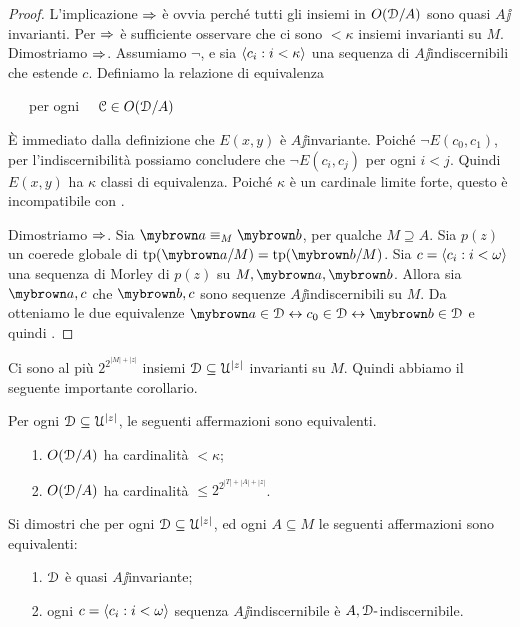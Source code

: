 \begin{proof}
L'implicazione $\Rightarrow$ \`e ovvia perch\'e tutti gli insiemi in $O(\EuScript D/A)$ sono quasi $A\jj$invarianti. Per $\Rightarrow$ \`e sufficiente osservare che ci sono $<\kappa$ insiemi invarianti su $M$. Dimostriamo $\Rightarrow$. Assumiamo $\neg$, e sia $\langle c_i:i<\kappa\rangle$ una sequenza di $A\jj$indiscernibili che estende $c$.  Definiamo la relazione di equivalenza 

\ \ \ per ogni \ \ $\EuScript C\in O(\EuScript D/A)$

\`E immediato dalla definizione che $E(x,y)$ \`e $A\jj$invariante. Poich\'e $\neg E(c_0,c_1)$, per l'indiscernibilit\`a possiamo concludere che  $\neg   E(c_i,c_j)$ per ogni $i<j$. Quindi $E(x,y)$ ha $\kappa$ classi di equivalenza. Poich\'e $\kappa$ \`e un cardinale limite forte, questo \`e incompatibile con .

Dimostriamo $\Rightarrow$. Sia ${\mr a}\equiv_M{\mr b}$, per qualche $M\supseteq A$. Sia $p(z)$ un coerede globale di $\tp({\mr a
}/M)=\tp({\mr b}/M)$. Sia $c=\langle c_i:i<\omega\rangle$ una sequenza di Morley di $p(z)$ su $M,{\mr a},{\mr b}$. Allora sia ${\mr a},c$ che ${\mr b},c$ sono sequenze $A\jj$indiscernibili su $M$. Da  otteniamo le due equivalenze ${\mr a}\in\D\iff c_0\in\D\iff {\mr b}\in\D$ e quindi . 
\end{proof}

Ci sono al pi\`u $2^{2^{|M|+|z|}}$ insiemi $\EuScript D\subseteq\EuScript U^{|z|}$ invarianti su $M$. Quindi abbiamo il seguente importante corollario.  

\begin{corollary}Per ogni $\EuScript D\subseteq\EuScript U^{|z|}$, le seguenti affermazioni sono equivalenti.
\begin{itemize}
\item[1.] $O(\EuScript D/A)$ ha cardinalit\`a $<\kappa$;
\item[2.] $O(\EuScript D/A)$ ha cardinalit\`a $\le 2^{2^{|T|+|A|+|z|}}$.\QED
\end{itemize} 
\end{corollary}


\begin{exercise}
Si dimostri che per ogni $\EuScript D\subseteq\EuScript U^{|z|}$, ed ogni $A\subseteq M$ le seguenti affermazioni sono equivalenti:
\begin{itemize}
\item[1.] $\EuScript D$ \`e quasi $A\jj$invariante;
\item[2.] ogni $c=\langle c_i:i<\omega\rangle$ sequenza $A\jj$indiscernibile \`e $A,\EuScript D\mbox{-}$indiscernibile.\QED
\end{itemize}
\end{exercise}

